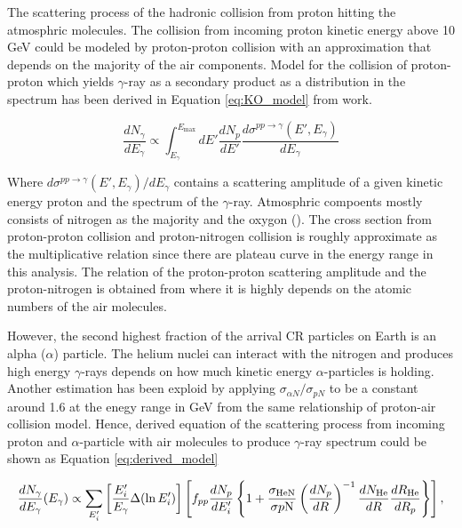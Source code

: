 The scattering process of the hadronic collision from proton hitting 
the atmosphric molecules. The collision from incoming proton kinetic 
energy above 10 GeV could be modeled by proton-proton collision with 
an approximation that depends on the majority of the air components.
Model for the collision of proton-proton which yields $\gamma$-ray 
as a secondary product as a distribution in the spectrum has been 
derived in Equation \ref{eq:KO_model} from \cite{K&Omodel} work.

\begin{equation}
    \frac{dN_\gamma}{dE_\gamma} \propto \int^{E_{\text{max}}}_{E_\gamma} dE'\frac{dN_p}{dE'} \frac{d\sigma^{pp\rightarrow\gamma}(E',E_\gamma)}{dE_\gamma}
    \label{eq:KO_model}
\end{equation}

Where $d\sigma^{pp\rightarrow\gamma}(E',E_\gamma)/dE_\gamma$ contains 
a scattering amplitude of a given kinetic energy proton and the 
spectrum of the $\gamma$-ray. Atmosphric compoents mostly consists 
of nitrogen as the majority and the oxygon (\cite{atmosCompos}). The cross section from 
proton-proton collision and proton-nitrogen collision is roughly 
approximate as the multiplicative relation since there are plateau 
curve in the energy range in this analysis. The relation of the proton-proton 
scattering amplitude and the proton-nitrogen is obtained from \cite{WAtwater}
where it is highly depends on the atomic numbers of the air molecules. 

However, the second highest fraction of the arrival CR particles on 
Earth is an alpha ($\alpha$) particle. The helium nuclei can interact 
with the nitrogen and produces high energy $\gamma$-rays depends on
how much kinetic energy $\alpha$-particles is holding. Another 
estimation has been exploid by applying $\sigma_{\alpha N}/\sigma_{pN}$
to be a constant around 1.6 at the enegy range in GeV from 
the same relationship of proton-air collision model. Hence, derived
equation of the scattering process from incoming 
proton and $\alpha$-particle with air molecules to produce $\gamma$-ray
spectrum could be shown as Equation \ref{eq:derived_model}

\begin{equation}
    \frac{dN_{\gamma}}{dE_\gamma}(E_\gamma) \propto
    \sum_{E'_i}\left[\frac{E'_i}{E_{\gamma}}\Delta(\ln E'_i) \right]
    \left[ 
        f_{pp}\frac{dN_p}{dE'_i}
        \left\{
            1+\frac{\sigma_{\text{HeN}}}{\sigma{p\rm N}}\left(\frac{dN_p}{dR}\right)^{-1} \frac{dN_{\text{He}}}{dR} \frac{dR_{\text{He}}}{dR_p} 
        \right\}
    \right]
    ,\label{eq:derived_model}
\end{equation}

